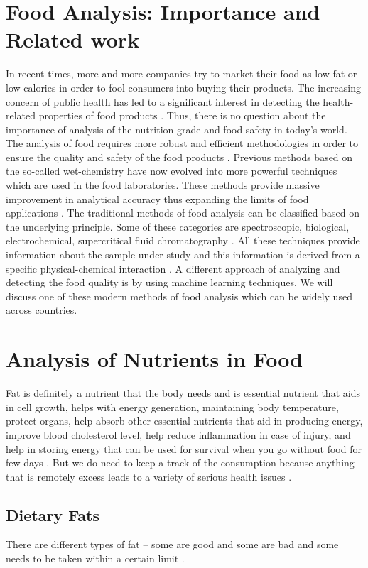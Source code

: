 \documentclass[sigconf]{acmart}
\begin{document}
\section{Food Analysis: Importance and Related work}
In recent times, more and more companies try to market their food as low-fat or low-calories in order to fool consumers into buying their products. The increasing concern of public health has led to a significant interest in detecting the health-related properties of food products  \cite{cifuentes2012food}. Thus, there is no question about the importance of analysis of the nutrition grade and food safety in today's world. The analysis of food requires more robust and efficient methodologies in order to ensure the quality and safety of the food products \cite{cifuentes2012food}. Previous methods based on the so-called wet-chemistry have now evolved into more powerful techniques which are used in the food laboratories. These methods provide massive improvement in analytical accuracy thus expanding the limits of food applications \cite{cifuentes2012food}. The traditional methods of food analysis can be classified based on the underlying principle. Some of these categories are spectroscopic, biological, electrochemical, supercritical fluid chromatography \cite{cifuentes2012food}. All these techniques provide information about the sample under study and this information is derived from a specific physical-chemical interaction \cite{cifuentes2012food}. A different approach of analyzing and detecting the food quality is by using machine learning techniques. We will discuss one of these modern methods of food analysis which can be widely used across countries.


\section{Analysis of Nutrients in Food}
Fat is definitely a nutrient that the body needs and is essential nutrient that aids in cell growth, helps with energy generation, maintaining body temperature, protect organs, help absorb other essential nutrients that aid in producing energy, improve blood cholesterol level, help reduce inflammation in case of injury, and help in storing energy that can be used for survival when you go without food for few days \cite{www-health}. But we do need to keep a track of the consumption because anything that is remotely excess leads to a variety of serious health issues \cite{www-health}.  

\subsection{Dietary Fats}
There are different types of fat – some are good and some are bad and some needs to be taken within a certain limit \cite{www-health}. 
\end{document}
